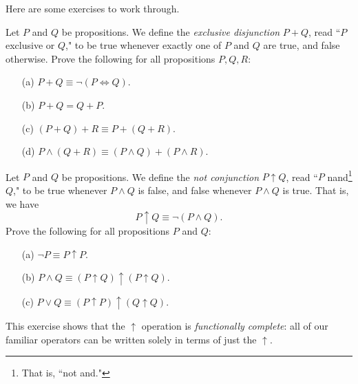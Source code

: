 \documentclass{article}
\begin{document}
Here are some exercises to work through.
\begin{exercise}
Let $P$ and $Q$ be propositions. We define the \textit{exclusive disjunction} $P + Q$, read ``$P$ exclusive or $Q$," to be true whenever exactly one of $P$ and $Q$ are true, and false otherwise. Prove the following for all propositions $P, Q, R$:
\begin{itemize}
    \item[(a)] $P+Q \equiv \lnot (P\iff Q)$.
    \item[(b)] $P+Q = Q+P$.
    \item[(c)] $(P+Q)+R \equiv P + (Q+R)$.
    \item[(d)] $P \land (Q+R) \equiv (P\land Q) + (P\land R)$.
\end{itemize}
\end{exercise}
\begin{exercise}
Let $P$ and $Q$ be propositions. We define the \textit{not conjunction} $P \uparrow Q$, read ``$P$ nand\footnote{That is, ``not and."} $Q$," to be true whenever $P\land Q$ is false, and false whenever $P\land Q$ is true. That is, we have
$$P\uparrow Q \equiv \lnot (P\land Q).$$
Prove the following for all propositions $P$ and $Q$:
\begin{itemize}
    \item[(a)] $\lnot P \equiv P\uparrow P$.
    \item[(b)] $P\land Q \equiv (P\uparrow Q) \uparrow (P \uparrow Q)$.
    \item[(c)] $P\lor Q \equiv (P\uparrow P) \uparrow (Q\uparrow Q)$.
\end{itemize}
This exercise shows that the $\uparrow$ operation is \textit{functionally complete}: all of our familiar operators can be written solely in terms of just the $\uparrow$.
\end{exercise}
\newpage
\end{document}
